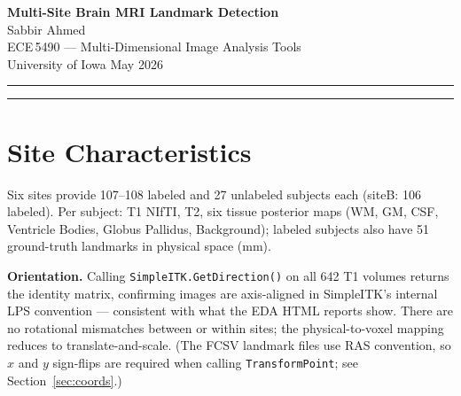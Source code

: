\documentclass[11pt,letterpaper]{article}
\begin{document}
\begin{center}
  {\LARGE\bfseries Multi-Site Brain MRI Landmark Detection}\\[8pt]
  {\large Sabbir Ahmed}\\[3pt]
  {\normalsize ECE\,5490 — Multi-Dimensional Image Analysis Tools\\[2pt]
  University of Iowa \quad May 2026}
\end{center}
\vspace{8pt}
\hrule
\vspace{6pt}

\begin{abstract}
\noindent
We build and evaluate a six-approach multi-site brain MRI landmark detection pipeline
predicting 51 anatomical landmarks across six simulated acquisition sites (642 labeled,
162 unlabeled subjects).
A 3D CNN achieves the best internal accuracy at \textbf{4.54\,mm} mean Euclidean error
on a 20\% per-site holdout and is submitted for all 162 unlabeled subjects.
Key findings: rigid ACPC-space registration is algebraically equivalent to the mean
baseline; posterior-weighted centroids add noise for sub-structure boundaries; coordinate
normalisation is critical for regression with targets far from the origin; orbital landmarks
(LE, RE) remain the dominant error source at 11--13\,mm across all approaches.
\end{abstract}

\vspace{4pt}
\hrule
\vspace{6pt}

\section{Site Characteristics}
\label{sec:sites}

Six sites provide 107--108 labeled and 27 unlabeled subjects each (siteB: 106 labeled).
Per subject: T1 NIfTI, T2, six tissue posterior maps (WM, GM, CSF, Ventricle Bodies,
Globus Pallidus, Background); labeled subjects also have 51 ground-truth landmarks in
physical space (mm).

\textbf{Orientation.}
Calling \texttt{SimpleITK.GetDirection()} on all 642 T1 volumes returns the identity matrix,
confirming images are axis-aligned in SimpleITK's internal LPS convention — consistent with
what the EDA HTML reports show.
There are no rotational mismatches between or within sites;
the physical-to-voxel mapping reduces to translate-and-scale.
(The FCSV landmark files use RAS convention, so $x$ and $y$ sign-flips are required when
calling \texttt{TransformPoint}; see Section~\ref{sec:coords}.)
\end{document}
